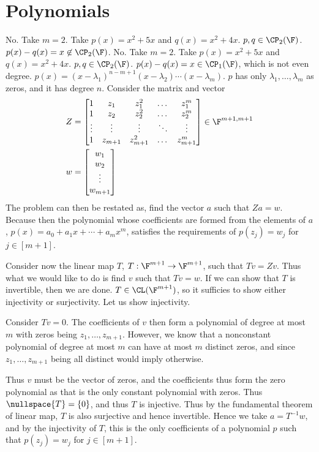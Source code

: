 \documentclass{book}
\begin{document}
\chapter{Polynomials}
\begin{enumerate}
  \ii 
  \ii 
    No. Take $m = 2$. Take $p(x) = x^2 + 5x$ and $q(x) = x^2 + 4x$. $p, q \in \CP_2(\F)$. $p(x) - q(x) = x \not\in \CP_2(\F)$.
  \ii 
    No. Take $m = 2$. Take $p(x) = x^2 + 5x$ and $q(x) = x^2 + 4x$. $p, q \in \CP_2(\F)$. $p(x) - q(x) = x \in \CP_1(\F)$, which is not even degree.
  \ii 
    $p(x) = (x - \lambda_1)^{n - m + 1}(x - \lambda_2)\cdots(x - \lambda_m)$. $p$ has only $\lambda_1, \dots, \lambda_m$ as zeros, and it has degree $n$.
  \ii
    Consider the matrix and vector
    \begin{align*}
      Z & = 
        \begin{bmatrix}
          1 & z_1 & z_1^2 & \dots & z_{1}^{m} \\
          1 & z_2 & z_2^2 & \dots & z_{2}^{m} \\
          \vdots & \vdots & \vdots & \ddots & \vdots \\
          1 & z_{m + 1} & z_{m + 1}^2 & \dots & z_{m + 1}^{m} 
        \end{bmatrix} \in \F^{m + 1, m + 1} \\
      w & = 
        \begin{bmatrix}
          w_1 \\
          w_2 \\
          \vdots \\
          w_{m + 1}
        \end{bmatrix}
    \end{align*}
    The problem can then be restated as, find the vector $a$ such that $Za = w$. Because then the polynomial whose coefficients are formed from the elements of $a$, $p(x) = a_0 + a_1x +
    \cdots + a_mx^{m}$, satisfies the requirements of $p(z_j) = w_j$ for $j \in [m + 1]$. 

    Consider now the linear map $T$, $T: \F^{m + 1} \to \F^{m + 1}$, such that $Tv = Zv$. Thus what we would like to do is find $v$ such that $Tv = w$. If we can show that $T$ is invertible,
    then we are done. $T \in \CL(\F^{m + 1})$, so it sufficies to show either injectivity or surjectivity. Let us show injectivity. 

    Consider $Tv = 0$. The coefficients of $v$ then form a polynomial of degree at most $m$ with zeros being $z_1, \dots, z_{m + 1}$. However, we know that a nonconstant polynomial of degree
    at most $m$ can have at most $m$ distinct zeros, and since $z_1, \dots, z_{m + 1}$ being all distinct would imply otherwise. 

    Thus $v$ must be the vector of zeros, and the coefficients thus form the zero polynomial as that is the only constant polynomial with zeros. Thus $\nullspace{T} = \{0\}$, and thus $T$ is
    injective. Thus by the fundamental theorem of linear map, $T$ is also surjective and hence invertible. Hence we take $a = T^{-1}w$, and by the injectivity of $T$, this is the only
    coefficients of a polynomial $p$ such that $p(z_j) = w_j$ for $j \in [m + 1]$.
\end{enumerate}
\end{document}
